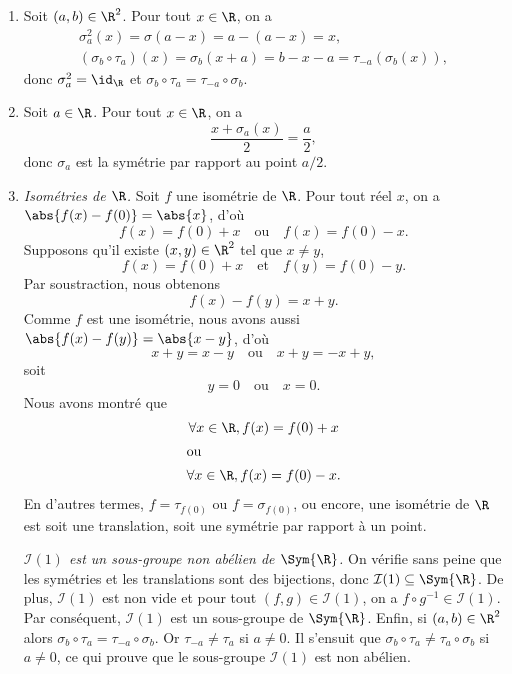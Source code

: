 \begin{enumerate}
  \item %
    Soit $(a,b)\in\R^2$.
    Pour tout $x\in\R$, on a
    \begin{gather*}
      \sigma_a^2(x) = \sigma(a - x) = a - (a - x) = x, \\
      (\sigma_b\circ \tau_a)(x) = \sigma_b(x + a) = b - x - a = \tau_{-a}(\sigma_b(x)),
    \end{gather*}
    donc $\sigma_a^2 = \id_\R$ et $\sigma_b\circ \tau_a = \tau_{-a}\circ \sigma_b$.

  \item %
    Soit $a\in\R$.
    Pour tout $x\in\R$, on a
    \[
      \frac{x + \sigma_a(x)}{2} = \frac{a}{2},
    \]
    donc $\sigma_a$ est la symétrie par rapport au point $a/2$.

  \item %
    \emph{Isométries de $\R$.}
    Soit $f$ une isométrie de $\R$.
    Pour tout réel $x$, on a $\abs{f(x) - f(0)} = \abs{x}$, d'où
    \[
      f(x) = f(0) + x \quad\text{ou}\quad f(x) = f(0) - x.
    \]
    Supposons qu'il existe $(x,y)\in\R^2$ tel que $x\neq y$,
    \[
      f(x) = f(0) + x \quad\text{et}\quad f(y) = f(0) - y.
    \]
    Par soustraction, nous obtenons
    \[
      f(x) - f(y) = x + y.
    \]
    Comme $f$ est une isométrie, nous avons aussi $\abs{f(x) - f(y)} = \abs{x - y}$, d'où
    \[
      x + y = x - y \quad\text{ou}\quad x + y = -x + y,
    \]
    soit
    \[
      y = 0 \quad\text{ou}\quad x = 0.
    \]
    Nous avons montré que
    \begin{gather*}
      \forall x\in\R, f(x) = f(0) + x \\
      \shortintertext{ou}
      \forall x\in\R, f(x) = f(0) - x.
    \end{gather*}
    En d'autres termes, $f = \tau_{f(0)}$ ou $f = \sigma_{f(0)}$, ou encore, une isométrie de $\R$ est soit une translation, soit une symétrie par rapport à un point.

    \emph{$\mathcal{I}(1)$ est un sous-groupe non abélien de $\Sym{\R}$.}
    On vérifie sans peine que les symétries et les translations sont des bijections, donc $\mathcal{I}(1)\subseteq\Sym{\R}$.
    De plus, $\mathcal{I}(1)$ est non vide et pour tout $(f,g)\in\mathcal{I}(1)$, on a $f\circ g^{-1}\in\mathcal{I}(1)$.
    Par conséquent, $\mathcal{I}(1)$ est un sous-groupe de $\Sym{\R}$.
    Enfin, si $(a,b)\in\R^2$ alors $\sigma_b\circ\tau_a = \tau_{-a}\circ\sigma_b$.
    Or $\tau_{-a}\neq \tau_a$ si $a\neq 0$.
    Il s'ensuit que $\sigma_b\circ\tau_a \neq \tau_a\circ\sigma_b$ si $a\neq 0$, ce qui prouve que le sous-groupe $\mathcal{I}(1)$ est non abélien.


\end{enumerate}
